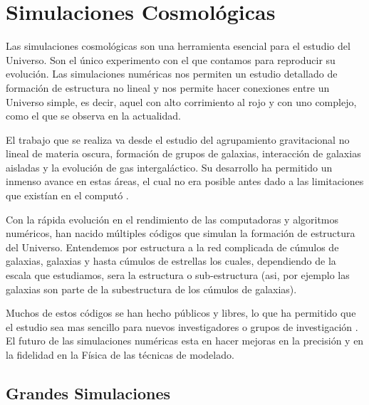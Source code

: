 
\chapter{Simulaciones Cosmológicas}
\label{chap:2 Sim}
\setcounter{equation}{0}

\noindent Las simulaciones cosmológicas son una herramienta esencial para el estudio del Universo. Son el único experimento con el que contamos para reproducir su evolución. Las simulaciones numéricas nos permiten un estudio detallado de formación de estructura no lineal y nos permite hacer conexiones entre un Universo simple, es decir, aquel con alto corrimiento al rojo y con uno complejo, como el que se observa en la actualidad.

El trabajo que se realiza va desde el estudio del agrupamiento gravitacional no lineal de materia oscura, formación de grupos de galaxias, interacción de galaxias aisladas y la evolución de gas intergaláctico. Su desarrollo ha permitido un inmenso avance en estas áreas, el cual no era posible antes dado a las limitaciones que existían en el computó \cite{2001NewA....6...79S}.


Con la rápida evolución en el rendimiento de las computadoras y algoritmos numéricos, han nacido múltiples códigos que simulan la formación de estructura del Universo. Entendemos por estructura a la red complicada de cúmulos de galaxias, galaxias y hasta cúmulos de estrellas los cuales, dependiendo de la escala que estudiamos, sera la estructura o sub-estructura (asi, por ejemplo las galaxias son parte de la subestructura de los cúmulos de galaxias).

Muchos de estos códigos se han hecho públicos y libres, lo que ha permitido que el estudio sea mas sencillo para nuevos investigadores o grupos de investigación \cite{2021MNRAS.506.2871S}. El futuro de las simulaciones numéricas esta en hacer mejoras en la precisión y en la fidelidad en la Física de las técnicas de modelado.

\newpage

\section{Grandes Simulaciones}

